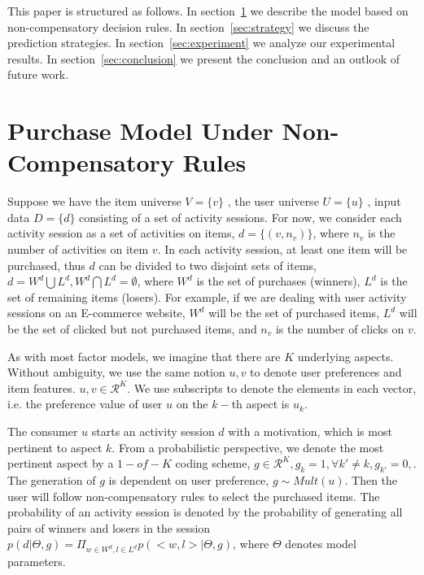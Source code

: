 \documentclass[sigconf]{acmart}
\begin{document}

This paper is structured as follows. In section~\ref{sec:model} we describe the model based on non-compensatory decision rules. In section~\ref{sec:strategy} we discuss the prediction strategies. In section~\ref{sec:experiment} we analyze our experimental results. In section~\ref{sec:conclusion} we present the conclusion and an outlook of future work.

\section{Purchase Model Under Non-Compensatory Rules}\label{sec:model}

Suppose we have the item universe $V=\{v\}$ , the user universe $U=\{u\}$ , input data $D=\{d\}$ consisting of a set of activity sessions. For now, we consider each activity session as a set of activities on items, $d=\{(v,n_v)\}$, where $n_v$ is the number of activities on item $v$.  In each activity session, at least one item will be purchased, thus $d$ can be divided to two disjoint sets of items, $d=W^d\bigcup L^d, W^d\bigcap L^d=\emptyset$, where $W^d$ is the set of purchases (winners), $L^d$ is the set of remaining items (losers). For example, if we are dealing with user activity sessions on an E-commerce website, $W^d$ will be the set of purchased items, $L^d$ will be the set of clicked but not purchased items, and $n_v$ is the number of clicks on $v$.


As with most factor models, we imagine that there are $K$ underlying aspects.  Without ambiguity, we use the same notion $u,v$ to denote user preferences and item features. $u,v\in \mathcal{R}^K$. We use subscripts to denote the elements in each vector, i.e. the preference value of user $u$ on the $k-$th aspect is $u_k$. 


The consumer $u$ starts an activity session $d$ with a motivation, which is most pertinent to aspect $k$. From a probabilistic perspective, we denote the most pertinent aspect by a $1-of-K$ coding scheme, $g\in \mathcal{R}^K, g_k=1,\forall k'\neq k, g_{k'}=0,$. The generation of $g$ is dependent on user preference, $g \sim Mult(u)$. Then the user will follow non-compensatory rules to select the purchased items. The probability of an activity session is denoted by the probability of generating all pairs of winners and losers in the session $p(d|\Theta, g)=\Pi_{w\in W^d, l \in L^d} p(<w,l>|\Theta,g)$, where $\Theta$ denotes model parameters. 
\end{document}
